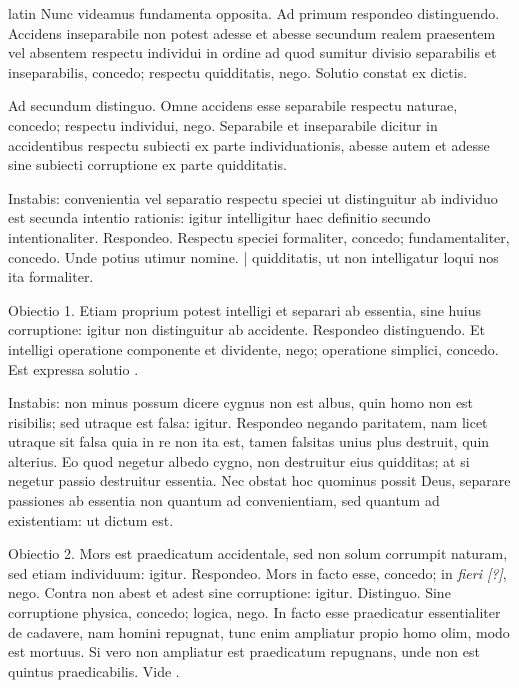 \begin{otherlanguage*}{latin}
\pstart
Nunc videamus fundamenta opposita. Ad primum respondeo distinguendo. Accidens inseparabile non potest adesse et abesse secundum realem praesentem vel absentem respectu individui in ordine ad quod sumitur divisio separabilis et inseparabilis, concedo; respectu quidditatis, nego. Solutio constat ex dictis. 
\pend

\pstart
Ad secundum distinguo. Omne accidens esse separabile respectu naturae, concedo; respectu individui, nego. Separabile et inseparabile dicitur in accidentibus respectu subiecti ex parte individuationis, abesse autem et adesse sine subiecti corruptione ex parte quidditatis. 
\pend

\pstart
Instabis:
convenientia vel separatio respectu speciei ut distinguitur ab individuo est secunda intentio rationis:
igitur intelligitur haec definitio secundo intentionaliter. Respondeo. Respectu speciei formaliter, concedo; fundamentaliter, concedo. Unde potius utimur nomine. \textnormal{|} quidditatis, ut non intelligatur loqui nos ita formaliter. 
\pend

\pstart
Obiectio 1. Etiam proprium potest intelligi et separari ab essentia, sine huius corruptione:
igitur non distinguitur ab accidente. Respondeo distinguendo. Et intelligi operatione componente et dividente, nego; operatione simplici, concedo. Est expressa solutio . 
\pend

\pstart
Instabis:
non minus possum dicere cygnus non est albus, quin homo non est risibilis; sed utraque est falsa:
igitur. Respondeo negando paritatem, nam licet utraque sit falsa quia in re non ita est, tamen falsitas unius plus destruit, quin alterius. Eo quod negetur albedo cygno, non destruitur eius quidditas; at si negetur passio destruitur essentia. Nec obstat hoc quominus possit Deus, separare passiones ab essentia non quantum ad convenientiam, sed quantum ad existentiam:
ut dictum est. 
\pend

\pstart
Obiectio 2. Mors est praedicatum accidentale, sed non solum corrumpit naturam, sed etiam individuum:
igitur. Respondeo. Mors in facto esse, concedo; in \emph{fieri [?]}, nego. Contra non abest et adest sine corruptione:
igitur. Distinguo. Sine corruptione physica, concedo; logica, nego. In facto esse praedicatur essentialiter de cadavere, nam homini repugnat, tunc enim ampliatur propio homo olim, modo est mortuus. Si vero non ampliatur est praedicatum repugnans, unde non est quintus praedicabilis. Vide . 
\pend


\end{otherlanguage*}
